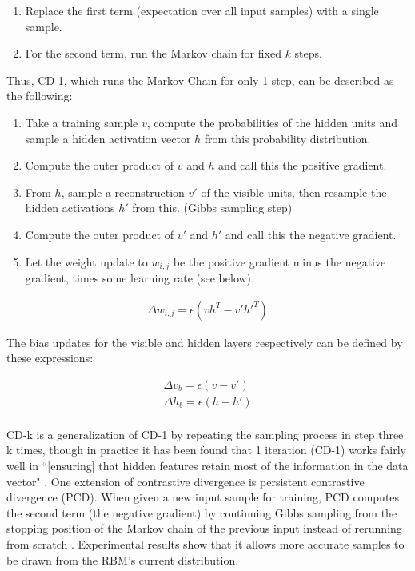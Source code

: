 \documentclass[journal]{IEEEtran}
\begin{document}
\begin{enumerate}
 \item Replace the first term (expectation over all input samples) with a single sample.
 \item For the second term, run the Markov chain for fixed $k$ steps.
\end{enumerate}

Thus, CD-1, which runs the Markov Chain for only 1 step, can be described as the following:

\begin{enumerate}
\item Take a training sample $v$, compute the probabilities of the hidden units and sample a hidden activation vector $h$ from this probability distribution.
\item Compute the outer product of $v$ and $h$ and call this the positive gradient.
\item From $h$, sample a reconstruction $v'$ of the visible units, then resample the hidden activations $h'$ from this. (Gibbs sampling step)
\item Compute the outer product of $v'$ and $h'$ and call this the negative gradient.
\item Let the weight update to $w_{i,j}$ be the positive gradient minus the negative gradient, times some learning rate (see below). 
\end{enumerate}

\begin{equation}
\begin{aligned}
\Delta w_{i,j} = \epsilon(vh^{T} - v'h'^{T})
\end{aligned}
\end{equation}

The bias updates for the visible and hidden layers respectively can be defined by these expressions:

\begin{equation}
\begin{aligned}
\Delta v_{b} = \epsilon(v - v')\\
\Delta h_{b} = \epsilon(h - h')\\
\end{aligned}
\end{equation}

CD-k is a generalization of CD-1 by repeating the sampling process in step three k times, though in practice it has been found that 1 iteration (CD-1) works fairly well in ``[ensuring] that hidden features retain most of the information in the data vector" \cite{hinton2010practical}.  One extension of contrastive divergence is persistent contrastive divergence (PCD). When given a new input sample for training, PCD computes the second term (the negative gradient) by continuing Gibbs sampling from the stopping position of the Markov chain of the previous input instead of rerunning from scratch \cite{tieleman2008training}. Experimental results show that it allows more accurate samples to be drawn from the RBM's current distribution. 
\end{document}
